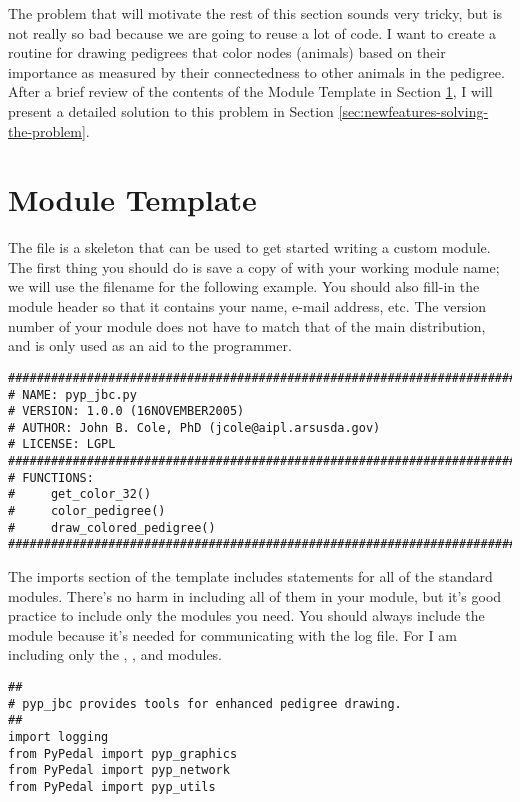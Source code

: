 The problem that will motivate the rest of this section sounds very tricky, but is not really so bad because we are going to
reuse a lot of code.  I want to create a routine for drawing pedigrees that color nodes (animals) based on their importance as
measured by their connectedness to other animals in the pedigree.  After a brief review of the contents of the Module Template
in Section \ref{sec:newfeatures-template}, I will present a detailed solution to this problem in Section
\ref{sec:newfeatures-solving-the-problem}.
\section{Module Template}
\label{sec:newfeatures-template}
The file  is a skeleton that can be used to get started writing a custom module.  The first thing you should do is save a copy of  with your working module name; we will use the filename  for the following example.  You should also fill-in the module header so that it contains your name, e-mail address, etc.  The version number of your module does not have to match that of the main \PyPedal{} distribution, and is only used as an aid to the programmer.
\begin{verbatim}
###############################################################################
# NAME: pyp_jbc.py
# VERSION: 1.0.0 (16NOVEMBER2005)
# AUTHOR: John B. Cole, PhD (jcole@aipl.arsusda.gov)
# LICENSE: LGPL
###############################################################################
# FUNCTIONS:
#     get_color_32()
#     color_pedigree()
#     draw_colored_pedigree()
###############################################################################
\end{verbatim}
The imports section of the template includes  statements for all of the standard \PyPedal{} modules.  There's
no harm in including all of them in your module, but it's good practice to include only the modules you need. You should
always include the  module because it's needed for communicating with the log file.  For 
I am including only the , , and  modules.
\begin{verbatim}
##
# pyp_jbc provides tools for enhanced pedigree drawing.
##
import logging
from PyPedal import pyp_graphics
from PyPedal import pyp_network
from PyPedal import pyp_utils
\end{verbatim}

